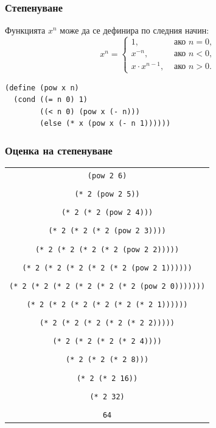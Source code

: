 \documentclass{beamer}
\begin{document}
\begin{frame}[fragile]
  \frametitle{Степенуване}

  Функцията $x^n$ може да се дефинира по следния начин:
  \begin{equation*}
    x^n = \begin{cases}
      1,&\text{ ако }n = 0,\\
      x^{-n},&\text{ ако }n < 0,\\
      x\cdot x^{n-1},&\text{ ако }n > 0.
    \end{cases}
  \end{equation*}

  \pause

\begin{verbatim}
(define (pow x n)
  (cond ((= n 0) 1)
        ((< n 0) (pow x (- n)))
        (else (* x (pow x (- n 1))))))
\end{verbatim}
\end{frame}

\begin{frame}
  \frametitle{Оценка на степенуване}

  \begin{center}
    \tiny
    \begin{tabular}{c}
      \tt{(pow 2 6)}\\
      \nxt{\bda\\
      \tt{(* 2 (pow 2 5))}\\
      \nxt{\bda\\
      \tt{(* 2 (* 2 (pow 2 4)))}\\
      \nxt{\bda\\
      \tt{(* 2 (* 2 (* 2 (pow 2 3))))}\\
      \nxt{\bda\\
      \tt{(* 2 (* 2 (* 2 (* 2 (pow 2 2)))))}\\
      \nxt{\bda\\
      \tt{(* 2 (* 2 (* 2 (* 2 (* 2 (pow 2 1))))))}\\
      \nxt{\bda\\
      \tt{(* 2 (* 2 (* 2 (* 2 (* 2 (* 2 (pow 2 0)))))))}\\
      \nxt{\bda\\
      \tt{(* 2 (* 2 (* 2 (* 2 (* 2 (* 2 1))))))}\\
      \nxt{\bda\\
      \tt{(* 2 (* 2 (* 2 (* 2 (* 2 2)))))}\\
      \nxt{\bda\\
      \tt{(* 2 (* 2 (* 2 (* 2 4))))}\\
      \nxt{\bda\\
      \tt{(* 2 (* 2 (* 2 8)))}\\
      \nxt{\bda\\
      \tt{(* 2 (* 2 16))}\\
      \nxt{\bda\\
      \tt{(* 2 32)}\\
      \nxt{\bda\\
      \tt{64}}}}}}}}}}}}}}
    \end{tabular}
  \end{center}

\end{frame}
\end{document}
